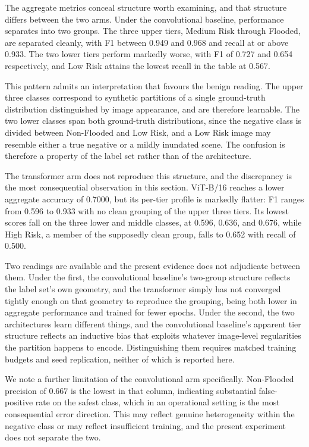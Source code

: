 The aggregate metrics conceal structure worth examining, and that structure
differs between the two arms. Under the convolutional baseline, performance
separates into two groups. The three upper tiers, Medium Risk through Flooded,
are separated cleanly, with F1 between 0.949 and 0.968 and recall at or above
0.933. The two lower tiers perform markedly worse, with F1 of 0.727 and 0.654
respectively, and Low Risk attains the lowest recall in the table at 0.567.

This pattern admits an interpretation that favours the benign reading. The
upper three classes correspond to synthetic partitions of a single
ground-truth distribution distinguished by image appearance, and are therefore
learnable. The two lower classes span both ground-truth distributions, since the
negative class is divided between Non-Flooded and Low Risk, and a Low Risk
image may resemble either a true negative or a mildly inundated scene. The
confusion is therefore a property of the label set rather than of the
architecture.

The transformer arm does not reproduce this structure, and the discrepancy is
the most consequential observation in this section. ViT-B/16 reaches a lower
aggregate accuracy of 0.7000, but its per-tier profile is markedly flatter: F1
ranges from 0.596 to 0.933 with no clean grouping of the upper three tiers. Its
lowest scores fall on the three lower and middle classes, at 0.596, 0.636, and
0.676, while High Risk, a member of the supposedly clean group, falls to 0.652
with recall of 0.500.

Two readings are available and the present evidence does not adjudicate between
them. Under the first, the convolutional baseline's two-group structure
reflects the label set's own geometry, and the transformer simply has not
converged tightly enough on that geometry to reproduce the grouping, being both
lower in aggregate performance and trained for fewer epochs. Under the second,
the two architectures learn different things, and the convolutional baseline's
apparent tier structure reflects an inductive bias that exploits whatever
image-level regularities the partition happens to encode. Distinguishing them
requires matched training budgets and seed replication, neither of which is
reported here.

We note a further limitation of the convolutional arm specifically.
Non-Flooded precision of 0.667 is the lowest in that column, indicating
substantial false-positive rate on the safest class, which in an operational
setting is the most consequential error direction. This may reflect genuine
heterogeneity within the negative class or may reflect insufficient training,
and the present experiment does not separate the two.

